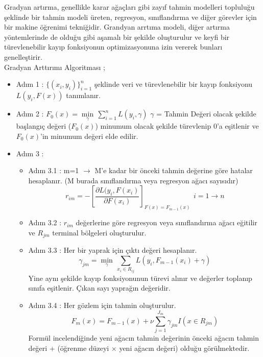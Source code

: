 \documentclass[12pt,twoside]{deuthesis}
\begin{document}
Gradyan artırma, genellikle karar ağaçları gibi zayıf tahmin modelleri topluluğu şeklinde bir tahmin modeli üreten, regresyon, sınıflandırma ve diğer görevler için bir makine öğrenimi tekniğidir. Grandyan arrtıma modeli, diğer artırma yöntemlerinde de olduğu gibi aşamalı bir şekilde oluşturulur ve keyfi bir türevlenebilir kayıp fonksiyonun optimizasyonuna izin vererek bunları genelleştirir.\\
Gradyan Arttırımı Algoritması ;
\begin{itemize}
\item
  Adım 1 : \(\{(x_i,y_i)\}_{i=1}^n\) şeklinde veri ve türevlenebilir bir kayıp fonksiyonu \(L(y_i,F(x))\) tanımlanır.
\item
  Adım 2 : \(F_0(x) = \min\limits_{\gamma}\,\sum_{i=1}^{n}L(y_i,\gamma)\) \(\gamma\) = Tahmin Değeri olacak şekilde başlangıç değeri (\(F_0(x)\)) minumum olacak şekilde türevlenip 0'a eşitlenir ve \(F_0(x)\)'in minumum değeri elde edilir.
\item
  Adım 3 :
  \begin{itemize}
  \item
    Adım 3.1 : m=1 \(\to\) M'e kadar bir önceki tahmin değerine göre hatalar hesaplanır. (M burada sınıflandırma veya regresyon ağacı sayısıdır)
    \[r_{im} = -\left[\frac{\partial L(y_i,F(x_i)}{\partial F(x_i)}\right]_{F(x)=F_{m-1}(x)}\:\,i=1 \to n\]
  \item
    Adım 3.2 : \(r_{im}\) değerlerine göre regresyon veya sınıflandırma ağacı eğitilir ve \(R_{jm}\) terminal bölgeleri oluşturulur.
  \item
    Adım 3.3 : Her bir yaprak için çıktı değeri hesaplanır.
    \[\gamma_{jm} = \min\limits_{\gamma}\,\sum_{x_i\in R_{ij}}L(y_i,F_{m-1}(x_i)+\gamma)\]
    Yine aynı şekilde kayıp fonksiyonunun türevi alınır ve değerler toplanıp sınıfa eşitlenir. Çıkan sayı yaprağın değeridir.
  \item
    Adım 3.4 : Her gözlem için tahmin oluşturulur.
    \[F_m(x) = F_{m-1}(x) + \nu\sum_{j=1}^{J_m}\gamma_{jm}I(x\in R_{jm})\]
    Formül incelendiğinde yeni ağacın tahmin değerinin önceki ağacın tahmin değeri + (öğrenme düzeyi \(\times\) yeni ağacın değeri) olduğu görülmektedir.
  \end{itemize}
\end{itemize}
\end{document}
